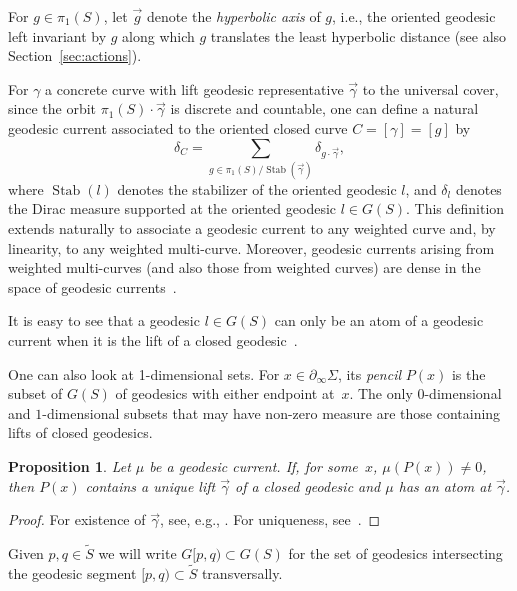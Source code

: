 \documentclass[11pt]{amsart}
\newcommand{\ora}[1]{\overrightarrow{#1}}
\numberwithin{equation}{section}
\numberwithin{figure}{section}
\newtheorem{proposition}[theorem]{Proposition}
\theoremstyle{definition}
\theoremstyle{plain}
\newcommand*{\wt}[1]{\widetilde{#1}}
\begin{document}
For $g \in \pi_1(S)$, let $\ora{g}$ denote the \emph{hyperbolic axis} of $g$, i.e., the oriented geodesic left invariant by $g$ along which $g$ translates the least hyperbolic distance (see also Section~\ref{sec:actions}).

For $\gamma$ a concrete curve with lift geodesic representative  $\ora{\gamma}$ to the
universal cover,
since the orbit $\pi_1(S)\cdot \ora{\gamma}$ is discrete and countable, one can define a natural geodesic current associated to the oriented closed curve $C=[\gamma]=[g]$ by
\begin{equation}\label{eq:delta-curve}
\delta_C
  = \sum_{g \in \pi_1(S)/\operatorname{Stab}(\ora{\gamma})}
    \delta_{g\cdot \ora{\gamma}},
\end{equation}
where $\operatorname{Stab}(l)$ denotes the stabilizer of the oriented
geodesic $l$, and $\delta_{l}$ denotes the Dirac measure supported at
the oriented geodesic $l\in G(S)$. This definition extends naturally to associate a geodesic current to any weighted curve and, by linearity, to any weighted multi-curve. Moreover, geodesic currents arising from weighted multi-curves (and also those from weighted curves) are dense in the space of geodesic currents~\cite[Proposition~4.4]{Bonahon86:EndsHyperbolicManifolds}.

It is easy to see that a geodesic $l \in G(S)$ can only be an atom of a geodesic current when it is the lift of a closed geodesic~\cite[Proposition~8.2.7]{Martelli16:IntroGeoTop}.

One can also look at 1-dimensional sets.
For $x \in \partial_{\infty}\Sigma$, its
\emph{pencil} $P(x)$ is the subset of $G(S)$ of geodesics with either
endpoint at~$x$.
The only $0$-dimensional and $1$-dimensional subsets
that may have non-zero measure are those containing lifts of closed
geodesics.

\begin{proposition}
  \label{prop:spikes}
  Let $\mu$ be a geodesic current. If, for some~$x$, $\mu(P(x)) \ne
  0$, then $P(x)$ contains a unique lift $\ora{\gamma}$ of a closed
  geodesic and $\mu$ has an atom at $\ora{\gamma}$.
\end{proposition}
\begin{proof}
  For existence of $\ora{\gamma}$, see, e.g.,
  \cite[Lemma~2.6]{dRMG22:Duals}.
For uniqueness, see~\cite[Corollary~4.2.3]{Martelli16:IntroGeoTop}.
\end{proof}

Given $p,q \in \wt{S}$ we will write  $G[p,q)\subset G(S)$ for the set of
geodesics intersecting the geodesic segment $[p,q) \subset \wt{S}$ transversally.
\end{document}
